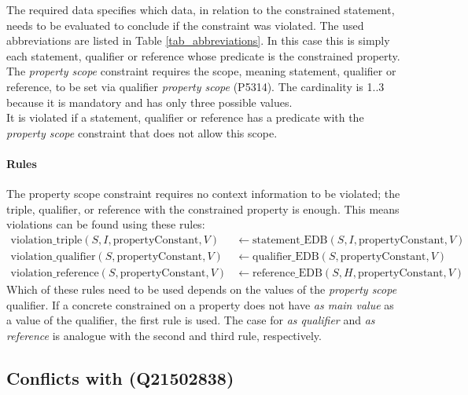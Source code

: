 \documentclass[hyperref,bachelorofscience,fleqn]{cgvpub}
\begin{document}
The required data specifies which data, in relation to the constrained statement, needs to be evaluated to conclude if the constraint was violated. The used abbreviations are listed in Table \ref{tab_abbreviations}. In this case this is simply each statement, qualifier or reference whose predicate is the constrained property.\\
The \emph{property scope} constraint requires the scope, meaning statement, qualifier or reference, to be set via qualifier \emph{property scope} (P5314). The cardinality is 1..3 because it is mandatory and has only three possible values.\\
It is violated if a statement, qualifier or reference has a predicate with the \emph{property scope} constraint that does not allow this scope.\\

\paragraph{Rules}
The property scope constraint requires no context information to be violated; the triple, qualifier, or reference with the constrained property is enough. This means violations can be found using these rules:
\begin{align*}
\text{violation\_triple}(S, I, \text{propertyConstant}, V) &\leftarrow \text{statement\_EDB}(S, I, \text{propertyConstant}, V)\\
\text{violation\_qualifier}(S, \text{propertyConstant}, V) &\leftarrow \text{qualifier\_EDB}(S, \text{propertyConstant}, V)\\
\text{violation\_reference}(S, \text{propertyConstant}, V) &\leftarrow \text{reference\_EDB}(S, H, \text{propertyConstant}, V)
\end{align*}
Which of these rules need to be used depends on the values of the \emph{property scope} qualifier. If a concrete constrained on a property does not have \emph{as main value} as a value of the qualifier, the first rule is used. The case for \emph{as qualifier} and \emph{as reference} is analogue with the second and third rule, respectively.

\subsection{Conflicts with (Q21502838)}
\end{document}
